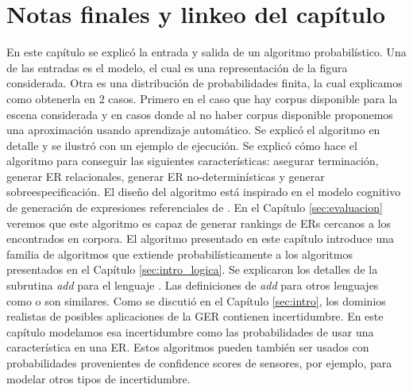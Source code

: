 %
%
%

\section{Notas finales y linkeo del cap\'itulo}
\label{sec:link-algoritmo}

En este cap\'itulo se explic\'o la entrada y salida de un algoritmo probabil\'istico. Una de las entradas es el modelo, el cual es una representaci\'on de la figura considerada. Otra es una distribuci\'on de probabilidades finita, la cual explicamos como obtenerla en 2 casos. Primero en el caso que hay corpus disponible para la escena considerada y en casos donde al no haber corpus disponible proponemos una aproximaci\'on usando aprendizaje autom\'atico. Se explic\'o el algoritmo en detalle y se ilustr\'o con un ejemplo de ejecuci\'on. Se explic\'o c\'omo hace el algoritmo para conseguir las siguientes caracter\'isticas: asegurar terminaci\'on, generar ER relacionales, generar ER no-determin\'isticas y generar sobreespecificaci\'on.
El dise\~no del algoritmo est\'a inspirado en el modelo cognitivo de generaci\'on de expresiones referenciales de \cite{keysar:Curr98}. En el Cap\'itulo \ref{sec:evaluacion} veremos que este algoritmo es capaz de generar rankings de ERs cercanos a los encontrados en corpora.
El algoritmo presentado en este cap\'itulo introduce una familia de algoritmos que extiende probabil\'isticamente a los algoritmos presentados en el Cap\'itulo \ref{sec:intro_logica}. Se explicaron los detalles de la subrutina \textit{add} para el lenguaje \EL. Las definiciones de \textit{add} para otros lenguajes como \ALC o \EPFOL son similares.
Como se discuti\'o en el Cap\'itulo \ref{sec:intro}, los dominios realistas de posibles aplicaciones de la GER contienen incertidumbre. En este cap\'itulo modelamos esa incertidumbre como las probabilidades de usar una caracter\'istica en una ER. 
Estos algoritmos pueden tambi\'en ser usados con probabilidades provenientes de confidence scores de sensores, por ejemplo, para modelar otros tipos de incertidumbre.
